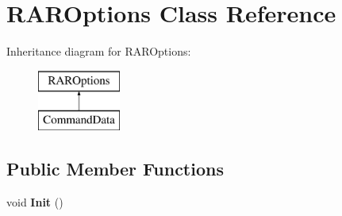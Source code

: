 \hypertarget{class_r_a_r_options}{\section{R\-A\-R\-Options Class Reference}
\label{class_r_a_r_options}
}
Inheritance diagram for R\-A\-R\-Options\-:\begin{figure}[H]
\begin{center}
\leavevmode
\includegraphics[height=2.000000cm]{class_r_a_r_options}
\end{center}
\end{figure}
\subsection*{Public Member Functions}
\begin{DoxyCompactItemize}
\item 
\hypertarget{class_r_a_r_options_ae403dd553c8755ce1bce25455c9f47b2}{void {\bfseries Init} ()}\label{class_r_a_r_options_ae403dd553c8755ce1bce25455c9f47b2}

\end{DoxyCompactItemize}
